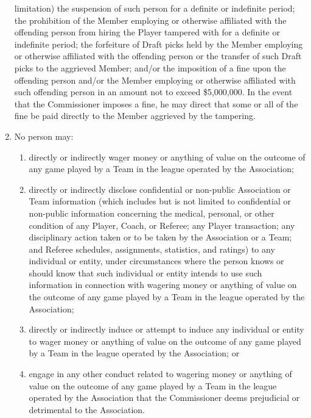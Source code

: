 \documentclass[]{book}
\providecommand{\tightlist}{%
  \setlength{\itemsep}{0pt}\setlength{\parskip}{0pt}}
\theoremstyle{definition}
\theoremstyle{definition}
\theoremstyle{definition}
\theoremstyle{remark}
\begin{document}
\begin{enumerate}
  limitation) the suspension of such person for a definite or indefinite
  period; the prohibition of the Member employing or otherwise
  affiliated with the offending person from hiring the Player tampered
  with for a definite or indefinite period; the forfeiture of Draft
  picks held by the Member employing or otherwise affiliated with the
  offending person or the transfer of such Draft picks to the aggrieved
  Member; and/or the imposition of a fine upon the offending person
  and/or the Member employing or otherwise affiliated with such
  offending person in an amount not to exceed \$5,000,000. In the event
  that the Commissioner imposes a fine, he may direct that some or all
  of the fine be paid directly to the Member aggrieved by the tampering.
\item
  No person may:

  \begin{enumerate}
  \def\labelenumii{(\roman{enumii})}
  \tightlist
  \item
    directly or indirectly wager money or anything of value on the
    outcome of any game played by a Team in the league operated by the
    Association;
  \item
    directly or indirectly disclose confidential or non-public
    Association or Team information (which includes but is not limited
    to confidential or non-public information concerning the medical,
    personal, or other condition of any Player, Coach, or Referee; any
    Player transaction; any disciplinary action taken or to be taken by
    the Association or a Team; and Referee schedules, assignments,
    statistics, and ratings) to any individual or entity, under
    circumstances where the person knows or should know that such
    individual or entity intends to use such information in connection
    with wagering money or anything of value on the outcome of any game
    played by a Team in the league operated by the Association;
  \item
    directly or indirectly induce or attempt to induce any individual or
    entity to wager money or anything of value on the outcome of any
    game played by a Team in the league operated by the Association; or
  \item
    engage in any other conduct related to wagering money or anything of
    value on the outcome of any game played by a Team in the league
    operated by the Association that the Commissioner deems prejudicial
    or detrimental to the Association.
  \end{enumerate}


\end{enumerate}
\end{document}
